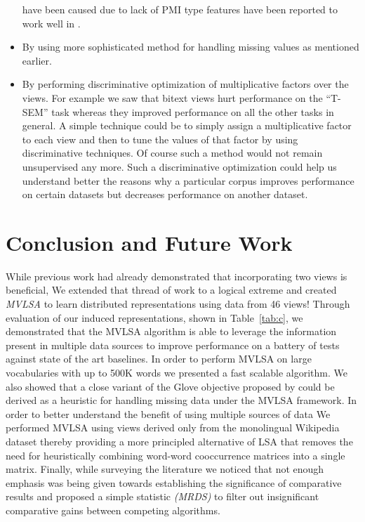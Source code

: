 \documentclass[11pt]{article}
\begin{document}
\begin{itemize}[leftmargin=*]
  have been caused due to lack of PMI type features have been reported
  to work well in \cite{levy2014neural}.  
\item By using more sophisticated method for handling missing values
  as mentioned earlier.
\item By performing discriminative optimization of multiplicative
  factors over the views. For example we saw that bitext views hurt
  performance on the ``T-SEM'' task whereas they improved performance
  on all the other tasks in general. A simple technique could be to
  simply assign a multiplicative factor to each view and 
  then to tune the values of that factor by using discriminative
  techniques. Of course such a method would not remain unsupervised any
  more. Such a discriminative optimization could help us understand
  better the reasons why a particular corpus improves performance on
  certain datasets but decreases performance on another dataset. %
\end{itemize}


\section{Conclusion and Future Work}
While previous work had already demonstrated that incorporating two views
is beneficial, We extended that thread of work to a
logical extreme and created \emph{MVLSA} to learn distributed 
representations using data from 46 views! Through evaluation of our
induced representations, shown in Table~\ref{tab:c}, we demonstrated that
the MVLSA algorithm is able to leverage the information present in  
multiple data sources to improve performance on a battery of tests
against state of the art baselines. In order to
 perform MVLSA on large vocabularies with up to 500K words
we presented a fast scalable algorithm. We also showed that a close
variant of the Glove objective proposed by 
 could be derived as a heuristic for
handling missing data under the MVLSA framework. In order to better
understand the benefit of using multiple sources of data We 
performed  MVLSA using views derived only from the monolingual Wikipedia
dataset thereby providing a more principled alternative of LSA that
removes the need for heuristically combining word-word cooccurrence 
matrices into a single matrix. Finally, while surveying the literature
we noticed that not enough emphasis was being given towards
establishing the significance of 
comparative results and proposed a simple statistic \emph{(MRDS)}
to filter out insignificant comparative gains between competing
algorithms.
\end{document}
